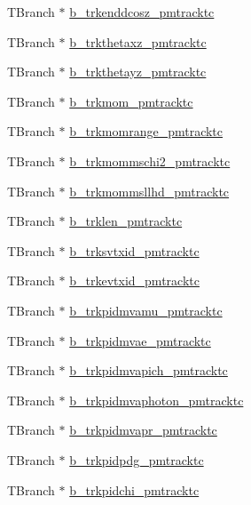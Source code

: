 \begin{DoxyCompactItemize}
\item 
T\-Branch $\ast$ \hyperlink{classanatree_a183f3cfaa5f6f42bfcb2dd3bd2df4b6e}{b\-\_\-trkenddcosz\-\_\-pmtracktc}
\item 
T\-Branch $\ast$ \hyperlink{classanatree_ad561c76632d04b70faf906487ada62c0}{b\-\_\-trkthetaxz\-\_\-pmtracktc}
\item 
T\-Branch $\ast$ \hyperlink{classanatree_ac15e5e08a57990892d1d7c2111982582}{b\-\_\-trkthetayz\-\_\-pmtracktc}
\item 
T\-Branch $\ast$ \hyperlink{classanatree_a782d889f8b5fd1d352b9b4d352f84da5}{b\-\_\-trkmom\-\_\-pmtracktc}
\item 
T\-Branch $\ast$ \hyperlink{classanatree_af743e149aff2e5acfebeaa5eb5678f2e}{b\-\_\-trkmomrange\-\_\-pmtracktc}
\item 
T\-Branch $\ast$ \hyperlink{classanatree_a52bb4b42ce9fd4bb175aa0a3c167cea5}{b\-\_\-trkmommschi2\-\_\-pmtracktc}
\item 
T\-Branch $\ast$ \hyperlink{classanatree_a038535f7a00f8049c3306b2119740fb3}{b\-\_\-trkmommsllhd\-\_\-pmtracktc}
\item 
T\-Branch $\ast$ \hyperlink{classanatree_a7636779ee5c4ddab49691d7521b58b16}{b\-\_\-trklen\-\_\-pmtracktc}
\item 
T\-Branch $\ast$ \hyperlink{classanatree_a802135c7ee1cf361df7b99cf3207c32f}{b\-\_\-trksvtxid\-\_\-pmtracktc}
\item 
T\-Branch $\ast$ \hyperlink{classanatree_af64608e06d4076adbcf587984592b2c5}{b\-\_\-trkevtxid\-\_\-pmtracktc}
\item 
T\-Branch $\ast$ \hyperlink{classanatree_a394abe52ad153a5137d9dca3e4b56ec1}{b\-\_\-trkpidmvamu\-\_\-pmtracktc}
\item 
T\-Branch $\ast$ \hyperlink{classanatree_afbc92e232adad53f05343e58a8eeaa3c}{b\-\_\-trkpidmvae\-\_\-pmtracktc}
\item 
T\-Branch $\ast$ \hyperlink{classanatree_a1ad2a2007476b2b42c034b99317105ac}{b\-\_\-trkpidmvapich\-\_\-pmtracktc}
\item 
T\-Branch $\ast$ \hyperlink{classanatree_a60e2be60803acd66f2c98d36c6337b0e}{b\-\_\-trkpidmvaphoton\-\_\-pmtracktc}
\item 
T\-Branch $\ast$ \hyperlink{classanatree_a08c13955d9f3ee78a9b0807727c51662}{b\-\_\-trkpidmvapr\-\_\-pmtracktc}
\item 
T\-Branch $\ast$ \hyperlink{classanatree_aab4d0917fbdeb44aa67a3ed45c6d32a5}{b\-\_\-trkpidpdg\-\_\-pmtracktc}
\item 
T\-Branch $\ast$ \hyperlink{classanatree_a8383a335092e34cd60fab8e4975395ab}{b\-\_\-trkpidchi\-\_\-pmtracktc}

\end{DoxyCompactItemize}
